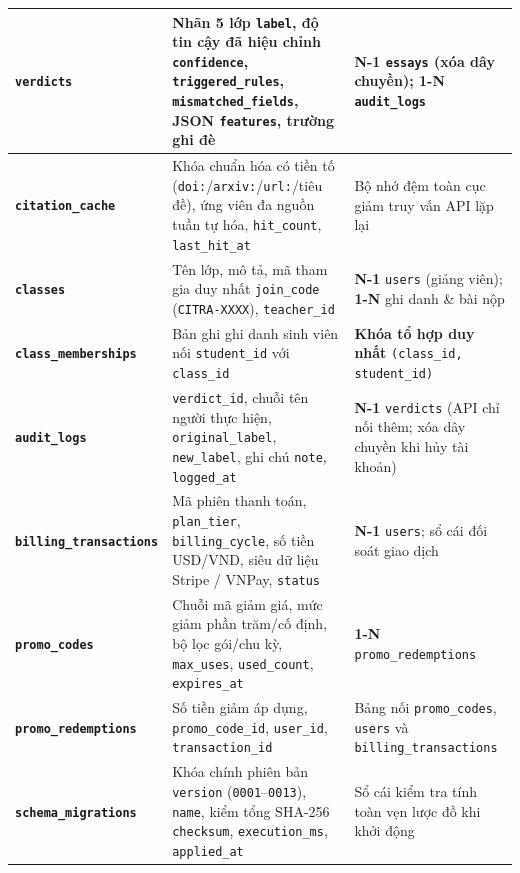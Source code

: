 {\begin{longtable}{|L{0.25}|L{0.46}|L{0.29}|}
\hline
\textbf{\texttt{verdicts}} & Nhãn 5 lớp \texttt{label}, độ tin cậy đã hiệu chỉnh \texttt{confidence}, \texttt{triggered\_rules}, \texttt{mismatched\_fields}, JSON \texttt{features}, trường ghi đè & \textbf{N-1} \texttt{essays} (xóa dây chuyền); \textbf{1-N} \texttt{audit\_logs} \\
\hline
\textbf{\texttt{citation\_cache}} & Khóa chuẩn hóa có tiền tố (\texttt{doi:}/\texttt{arxiv:}/\texttt{url:}/tiêu đề), ứng viên đa nguồn tuần tự hóa, \texttt{hit\_count}, \texttt{last\_hit\_at} & Bộ nhớ đệm toàn cục giảm truy vấn API lặp lại \\
\hline
\textbf{\texttt{classes}} & Tên lớp, mô tả, mã tham gia duy nhất \texttt{join\_code} (\texttt{CITRA-XXXX}), \texttt{teacher\_id} & \textbf{N-1} \texttt{users} (giảng viên); \textbf{1-N} ghi danh \& bài nộp \\
\hline
\textbf{\texttt{class\_memberships}} & Bản ghi ghi danh sinh viên nối \texttt{student\_id} với \texttt{class\_id} & \textbf{Khóa tổ hợp duy nhất} \texttt{(class\_id, student\_id)} \\
\hline
\textbf{\texttt{audit\_logs}} & \texttt{verdict\_id}, chuỗi tên người thực hiện, \texttt{original\_label}, \texttt{new\_label}, ghi chú \texttt{note}, \texttt{logged\_at} & \textbf{N-1} \texttt{verdicts} (API chỉ nối thêm; xóa dây chuyền khi hủy tài khoản) \\
\hline
\textbf{\texttt{billing\_transactions}} & Mã phiên thanh toán, \texttt{plan\_tier}, \texttt{billing\_cycle}, số tiền USD/VND, siêu dữ liệu Stripe / VNPay, \texttt{status} & \textbf{N-1} \texttt{users}; sổ cái đối soát giao dịch \\
\hline
\textbf{\texttt{promo\_codes}} & Chuỗi mã giảm giá, mức giảm phần trăm/cố định, bộ lọc gói/chu kỳ, \texttt{max\_uses}, \texttt{used\_count}, \texttt{expires\_at} & \textbf{1-N} \texttt{promo\_redemptions} \\
\hline
\textbf{\texttt{promo\_redemptions}} & Số tiền giảm áp dụng, \texttt{promo\_code\_id}, \texttt{user\_id}, \texttt{transaction\_id} & Bảng nối \texttt{promo\_codes}, \texttt{users} và \texttt{billing\_transactions} \\
\hline
\textbf{\texttt{schema\_migrations}} & Khóa chính phiên bản \texttt{version} (\texttt{0001}--\texttt{0013}), \texttt{name}, kiểm tổng SHA-256 \texttt{checksum}, \texttt{execution\_ms}, \texttt{applied\_at} & Sổ cái kiểm tra tính toàn vẹn lược đồ khi khởi động \\
\hline
\end{longtable}
}

